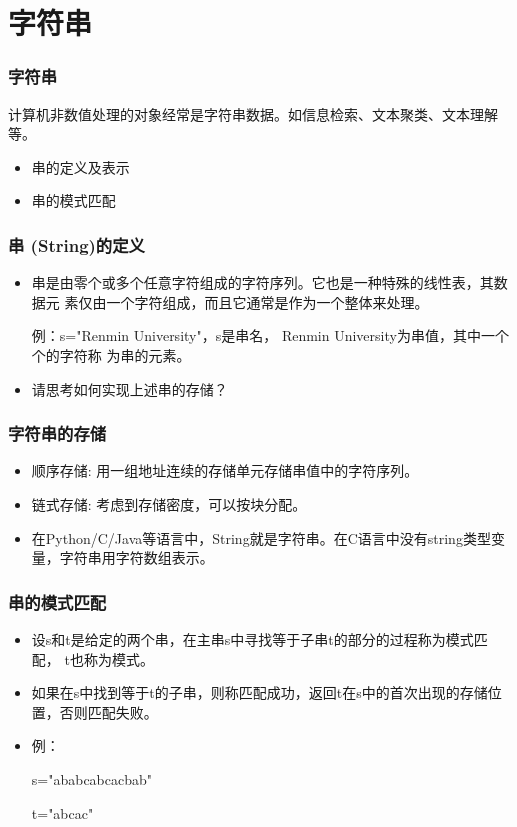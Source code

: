 \section{字符串}
\begin{frame}[fragile]
  \frametitle{字符串}
  计算机非数值处理的对象经常是字符串数据。如信息检索、文本聚类、文本理解等。

  \begin{itemize}
  \item 串的定义及表示
  \item 串的模式匹配
  \end{itemize}
\end{frame}

\begin{frame}[fragile]
  \frametitle{串 (String)的定义}

  \begin{itemize}
  \item 串是由零个或多个任意字符组成的字符序列。它也是一种特殊的线性表，其数据元
    素仅由一个字符组成，而且它通常是作为一个整体来处理。

例：s="Renmin University"，s是串名， Renmin University为串值，其中一个个的字符称
为串的元素。

  \item 请思考如何实现上述串的存储？
  \end{itemize}
\end{frame}

\begin{frame}[fragile]
  \frametitle{字符串的存储}
  \begin{itemize}
  \item 顺序存储: 用一组地址连续的存储单元存储串值中的字符序列。
  \item 链式存储: 考虑到存储密度，可以按块分配。
  \item 在Python/C/Java等语言中，String就是字符串。在C语言中没有string类型变量，字符串用字符数组表示。
  \end{itemize}
\end{frame}

\begin{frame}[fragile]
  \frametitle{串的模式匹配}
  \begin{itemize}
  \item 设s和t是给定的两个串，在主串s中寻找等于子串t的部分的过程称为模式匹配， t也称为模式。
  \item 如果在s中找到等于t的子串，则称匹配成功，返回t在s中的首次出现的存储位置，否则匹配失败。
  \item 例：

    s="ababcabcacbab"

    t="abcac"
  \end{itemize}
\end{frame}


